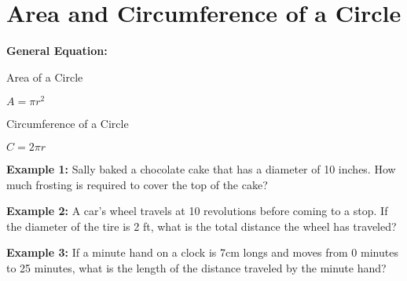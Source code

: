 \section{Area and Circumference of a Circle}

\textbf{General Equation:}

\begin{center}
\begin{multicols}{2}
Area of a Circle

\medskip
$A=\pi r^2$

Circumference of a Circle

\medskip
$C=2\pi r$
\end{multicols}
\end{center}

\vfill\textbf{Example 1:} Sally baked a chocolate cake that has a diameter of 10 inches. How much frosting is required to cover the top of the cake?

\vfill\textbf{Example 2:} A car's wheel travels at 10 revolutions before coming to a stop. If the diameter of the tire is 2 ft, what is the total distance the wheel has traveled?

\vfill\textbf{Example 3:} If a minute hand on a clock is 7cm longs and moves from 0 minutes to 25 minutes, what is the length of the distance traveled by the minute hand?


